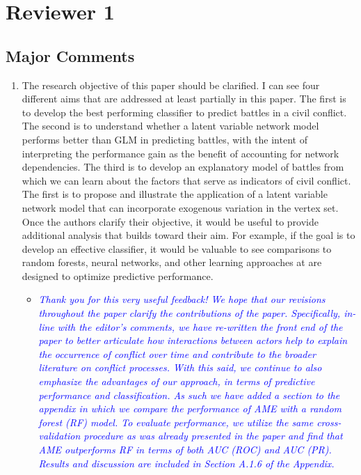 \section{Reviewer 1}

\subsection{Major Comments}

\begin{enumerate}
	\item The research objective of this paper should be clarified. I can see four different aims that are addressed at least partially in this paper. The first is to develop the best performing classifier to predict battles in a civil conflict. The second is to understand whether a latent variable network model performs better than GLM in predicting battles, with the intent of interpreting the performance gain as the benefit of accounting for network dependencies. The third is to develop an explanatory model of battles from which we can learn about the factors that serve as indicators of civil conflict. The first is to propose and illustrate the application of a latent variable network model that can incorporate exogenous variation in the vertex set. Once the authors clarify their objective, it would be useful to provide additional analysis that builds toward their aim. For example, if the goal is to develop an effective classifier, it would be valuable to see comparisons to random forests, neural networks, and other learning approaches at are designed to optimize predictive performance.
	\begin{itemize}
		\item \textcolor{blue}{ \emph{
		Thank you for this very useful feedback! We hope that our revisions throughout the paper clarify the contributions of the paper. Specifically, in-line with the editor's comments, we have re-written the front end of the paper to better articulate how interactions between actors help to explain the occurrence of conflict over time and contribute to the broader literature on conflict processes. With this said, we continue to also emphasize the advantages of our approach, in terms of predictive performance and classification. As such we have added a section to the appendix in which we compare the performance of AME with a random forest (RF) model. To evaluate performance, we utilize the same cross-validation procedure as was already presented in the paper and find that AME outperforms RF in terms of both AUC (ROC) and AUC (PR). Results and discussion are included in Section A.1.6 of the Appendix. 
}}
\end{itemize}
\end{enumerate}
